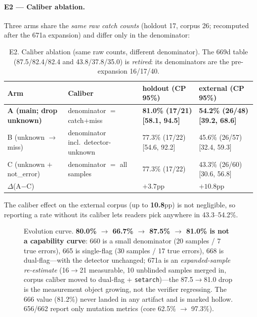 \documentclass{article}
\begin{document}
\paragraph{E2 --- Caliber ablation.} Three arms share the \emph{same raw catch counts}
(holdout 17, corpus 26; recomputed after the 671a expansion) and differ only in the denominator:
\begin{table}[t]
\caption{E2. Caliber ablation (same raw counts, different denominator). The 669d table
(87.5/82.4/82.4 and 43.8/37.8/35.0) is \emph{retired}: its denominators are the pre-expansion
16/17/40.}
\label{tab:e2}
\centering
\small
\begin{tabular}{@{}lp{3.6cm}p{3.6cm}p{3.6cm}@{}}
\toprule
Arm & Caliber & holdout (CP 95\%) & external (CP 95\%) \\
\midrule
\textbf{A (main; drop unknown)} & denominator $=$ catch$+$miss & \textbf{81.0\% (17/21) [58.1, 94.5]} & \textbf{54.2\% (26/48) [39.2, 68.6]} \\
B (unknown $\to$ miss) & denominator incl.\ detector-unknown & 77.3\% (17/22) [54.6, 92.2] & 45.6\% (26/57) [32.4, 59.3] \\
C (unknown $+$ not\_error) & denominator $=$ all samples & 77.3\% (17/22) & 43.3\% (26/60) [30.6, 56.8] \\
\midrule
$\Delta$(A$-$C) & & $+3.7$pp & $\mathbf{+10.8}$pp \\
\bottomrule
\end{tabular}
\end{table}
The caliber effect on the external corpus (up to \textbf{10.8}pp) is not negligible, so reporting
a rate without its caliber lets readers pick anywhere in 43.3--54.2\%.

\begin{figure}[t]
\centering
{}
\caption{Evolution curve. \textbf{80.0\% $\to$ 66.7\% $\to$ 87.5\% $\to$ 81.0\% is not a
capability curve}: 660 is a small denominator (20 samples / 7 true errors), 665 is single-flag
(30 samples / 17 true errors), 668 is dual-flag---with the detector unchanged; 671a is an
\emph{expanded-sample re-estimate} (16$\to$21 measurable, 10 unblinded samples merged in, corpus
caliber moved to dual-flag $+$ \texttt{setarch})---the 87.5$\to$81.0 drop is the measurement
object growing, not the verifier regressing. The 666 value (81.2\%) never landed in
any artifact and is marked hollow. 656/662 report only mutation metrics (core 62.5\% $\to$ 97.3\%).}
\label{fig:evolution}
\end{figure}
\end{document}
